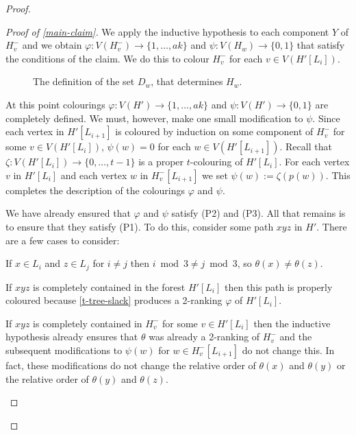 \documentclass[kpfonts]{patmorin}
\theoremstyle{named}
\begin{document}
\begin{proof}
\begin{proof}[Proof of \cref{main-claim}]
       We apply the inductive hypothesis to each component $Y$ of $H^-_v$ and we obtain $\varphi:V(H^-_v)\to\{1,\ldots,ak\}$ and $\psi:V(H_w)\to\{0,1\}$ that satisfy the conditions of the claim.  We do this to colour $H^-_v$ for each $v\in V(H'[L_i])$.

       \begin{figure}
           \caption{The definition of the set $D_w$, that determines $H_w$.}
           \label{subproblems}
       \end{figure}

       At this point colourings $\varphi:V(H')\to\{1,\ldots,ak\}$ and $\psi:V(H')\to\{0,1\}$ are completely defined.  We must, however, make one small modification to $\psi$.  Since each vertex in $H'[L_{i+1}]$ is coloured by induction on some component of $H^-_v$ for some $v\in V(H'[L_i])$, $\psi(w)=0$ for each $w\in V(H'[L_{i+1}])$.
       Recall that $\zeta:V(H'[L_i])\to\{0,\ldots,t-1\}$ is a proper $t$-colouring of $H'[L_i]$.  For each vertex $v$ in $H'[L_i]$ and each vertex $w$ in $H^-_v[L_{i+1}]$ we set $\psi(w):=\zeta(p(w))$.  This completes the description of the colourings $\varphi$ and $\psi$.

       We have already ensured that $\varphi$ and $\psi$ satisfy (P2) and (P3). All that remains is to ensure that they satisfy (P1).  To do this, consider some path $xyz$ in $H'$.  There are a few cases to consider:
       \begin{compactenum}
          \item If $x\in L_i$ and $z\in L_j$ for $i\neq j$ then $i\bmod 3\neq j\bmod 3$, so $\theta(x)\neq\theta(z)$.

          \item If $xyz$ is completely contained in the forest $H'[L_i]$ then this path is properly coloured because \cref{t-tree-slack} produces a 2-ranking $\varphi$ of $H'[L_i]$.

          \item If $xyz$ is completely contained in $H^-_v$ for some $v\in H'[L_i]$ then the inductive hypothesis already ensures that $\theta$ was already a 2-ranking of $H^-_v$ and the subsequent modifications to $\psi(w)$ for $w\in H^-_v[L_{i+1}]$ do not change this. In fact, these modifications do not change the relative order of $\theta(x)$ and $\theta(y)$ or the relative order of $\theta(y)$ and $\theta(z)$.


\end{compactenum}
\end{proof}
\end{proof}
\end{document}
